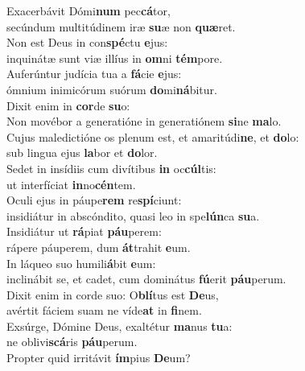 \oddverse Exacerbávit Dómi\textbf{num} pec\textbf{cá}tor,~\*\\
\oddverse secúndum multitúdinem iræ \textbf{su}æ non \textbf{quæ}ret.\\
\evenverse Non est Deus in con\textbf{spé}ctu \textbf{e}jus:~\*\\
\evenverse inquinátæ sunt viæ illíus in \textbf{om}ni \textbf{tém}pore.\\
\oddverse Auferúntur judícia tua a \textbf{fá}cie \textbf{e}jus:~\*\\
\oddverse ómnium inimicórum suórum \textbf{do}mi\textbf{ná}bitur.\\
\evenverse Dixit enim in \textbf{cor}de \textbf{su}o:~\*\\
\evenverse Non movébor a generatióne in generatiónem \textbf{si}ne \textbf{ma}lo.\\
\oddverse Cujus maledictióne os plenum est, et amaritúdi\textbf{ne}, et \textbf{do}lo:~\*\\
\oddverse sub lingua ejus \textbf{la}bor et \textbf{do}lor.\\
\evenverse Sedet in insídiis cum divítibus \textbf{in} oc\textbf{cúl}tis:~\*\\
\evenverse ut interfíciat \textbf{in}no\textbf{cén}tem.\\
\oddverse Oculi ejus in páupe\textbf{rem} re\textbf{spí}ciunt:~\*\\
\oddverse insidiátur in abscóndito, quasi leo in spe\textbf{lún}ca \textbf{su}a.\\
\evenverse Insidiátur ut \textbf{rá}piat \textbf{páu}perem:~\*\\
\evenverse rápere páuperem, dum \textbf{át}trahit \textbf{e}um.\\
\oddverse In láqueo suo humili\textbf{á}bit \textbf{e}um:~\*\\
\oddverse inclinábit se, et cadet, cum dominátus \textbf{fú}erit \textbf{páu}perum.\\
\evenverse Dixit enim in corde suo: O\textbf{blí}tus est \textbf{De}us,~\*\\
\evenverse avértit fáciem suam ne víde\textbf{at} in \textbf{fi}nem.\\
\oddverse Exsúrge, Dómine Deus, exaltétur \textbf{ma}nus \textbf{tu}a:~\*\\
\oddverse ne oblivi\textbf{scá}ris \textbf{páu}perum.\\
\evenverse Propter quid irritávit \textbf{ím}pius \textbf{De}um?~\*\\
